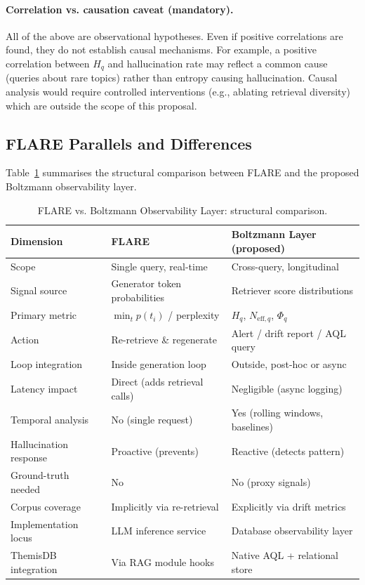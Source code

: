 \documentclass[11pt,a4paper]{article}
\theoremstyle{definition}
\begin{document}
\paragraph{Correlation vs. causation caveat (mandatory).}
All of the above are observational hypotheses.
Even if positive correlations are found, they do not establish causal
mechanisms.
For example, a positive correlation between $H_q$ and hallucination
rate may reflect a common cause (queries about rare topics) rather
than entropy causing hallucination.
Causal analysis would require controlled interventions (e.g., ablating
retrieval diversity) which are outside the scope of this proposal.

\subsection{FLARE Parallels and Differences}
\label{sec:flare_parallel}

Table~\ref{tab:flare_comparison} summarises the structural comparison
between FLARE and the proposed Boltzmann observability layer.

\begin{table}[ht]
  \centering
  \caption{FLARE vs. Boltzmann Observability Layer: structural comparison.}
  \label{tab:flare_comparison}
  \begin{tabular}{@{}lll@{}}
    \toprule
    \textbf{Dimension} & \textbf{FLARE} & \textbf{Boltzmann Layer (proposed)} \\
    \midrule
    Scope & Single query, real-time & Cross-query, longitudinal \\
    Signal source & Generator token probabilities & Retriever score distributions \\
    Primary metric & $\min_t p(t_i)$ / perplexity & $H_q$, $N_{\text{eff},q}$, $\Phi_q$ \\
    Action & Re-retrieve \& regenerate & Alert / drift report / AQL query \\
    Loop integration & Inside generation loop & Outside, post-hoc or async \\
    Latency impact & Direct (adds retrieval calls) & Negligible (async logging) \\
    Temporal analysis & No (single request) & Yes (rolling windows, baselines) \\
    Hallucination response & Proactive (prevents) & Reactive (detects pattern) \\
    Ground-truth needed & No & No (proxy signals) \\
    Corpus coverage & Implicitly via re-retrieval & Explicitly via drift metrics \\
    Implementation locus & LLM inference service & Database observability layer \\
    ThemisDB integration & Via RAG module hooks & Native AQL + relational store \\
    \bottomrule
  \end{tabular}
\end{table}
\end{document}
